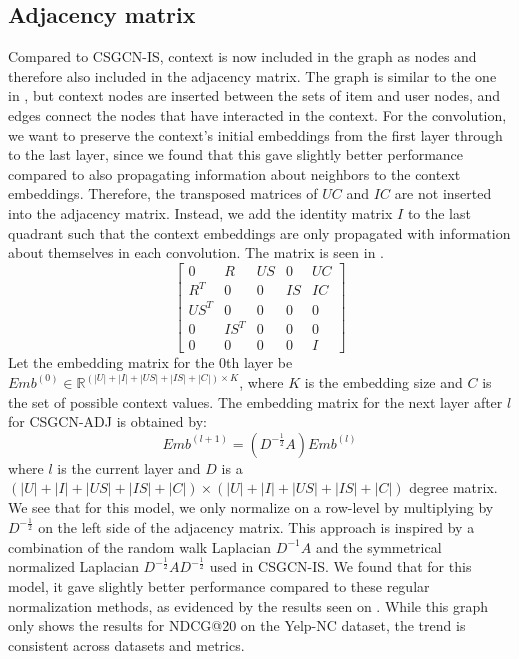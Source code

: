 \subsection{Adjacency matrix}\label{subsec:csgcn_adj_adj_mat}
Compared to CSGCN-IS, context is now included in the graph as nodes and therefore also included in the adjacency matrix.
The graph is similar to the one in , but context nodes are inserted between the sets of item and user nodes, and edges connect the nodes that have interacted in the context.
For the convolution, we want to preserve the context's initial embeddings from the first layer through to the last layer, since we found that this gave slightly better performance compared to also propagating information about neighbors to the context embeddings.
Therefore, the transposed matrices of $UC$ and $IC$ are not inserted into the adjacency matrix.
Instead, we add the identity matrix $I$ to the last quadrant such that the context embeddings are only propagated with information about themselves in each convolution.
The matrix is seen in .
\begin{equation}\label{csgcn_adj_adj_mat}
    \begin{bmatrix}
    0 & R & US & 0 & UC\\
    R^T & 0 & 0 & IS & IC\\
    US^T & 0 & 0 & 0 & 0\\
    0 & IS^T & 0 & 0 & 0 \\
    0 & 0 & 0 & 0 & I
    \end{bmatrix}
\end{equation}
Let the embedding matrix for the 0th layer be $Emb^{(0)} \in \mathbb{R}^{(|U| + |I| + |US| + |IS| + |C|) \times K}$, where $K$ is the embedding size and $C$ is the set of possible context values.
The embedding matrix for the next layer after $l$ for CSGCN-ADJ is obtained by:
\begin{equation}
    Emb^{(l+1)} = (D^{-\frac{1}{2}}A)Emb^{(l)}
\end{equation}
where $l$ is the current layer and $D$ is a $(|U| + |I| + |US| + |IS| + |C|) \times (|U| + |I| + |US| + |IS|+ |C|)$ degree matrix. 
We see that for this model, we only normalize on a row-level by multiplying by $D^{-\frac{1}{2}}$ on the left side of the adjacency matrix.
This approach is inspired by a combination of the random walk Laplacian $D^{-1}A$ and the symmetrical normalized Laplacian $D^{-\frac{1}{2}}AD^{-\frac{1}{2}}$ used in CSGCN-IS.
We found that for this model, it gave slightly better performance compared to these regular normalization methods, as evidenced by the results seen on .
While this graph only shows the results for NDCG@20 on the Yelp-NC dataset, the trend is consistent across datasets and metrics.

